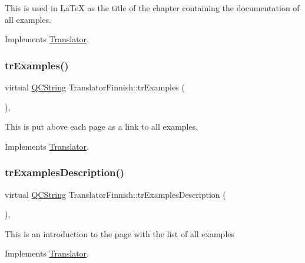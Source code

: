 This is used in La\+TeX as the title of the chapter containing the documentation of all examples. 

Implements \mbox{\hyperlink{class_translator}{Translator}}.

\mbox{\label{class_translator_finnish_a3e1175a17bd1dc864dfcbc5434eb0c8d}} 
\subsubsection{\texorpdfstring{trExamples()}{trExamples()}}
{\footnotesize\ttfamily virtual \mbox{\hyperlink{class_q_c_string}{Q\+C\+String}} Translator\+Finnish\+::tr\+Examples (\begin{DoxyParamCaption}{ }\end{DoxyParamCaption})\hspace{0.3cm}{\ttfamily [inline]}, {\ttfamily [virtual]}}

This is put above each page as a link to all examples. 

Implements \mbox{\hyperlink{class_translator}{Translator}}.

\mbox{\label{class_translator_finnish_a3374b8c8f1bc8eed4a680a4d179667dc}} 
\subsubsection{\texorpdfstring{trExamplesDescription()}{trExamplesDescription()}}
{\footnotesize\ttfamily virtual \mbox{\hyperlink{class_q_c_string}{Q\+C\+String}} Translator\+Finnish\+::tr\+Examples\+Description (\begin{DoxyParamCaption}{ }\end{DoxyParamCaption})\hspace{0.3cm}{\ttfamily [inline]}, {\ttfamily [virtual]}}

This is an introduction to the page with the list of all examples 

Implements \mbox{\hyperlink{class_translator}{Translator}}.

\mbox{\label{class_translator_finnish_a91cc50b9356cd63a2d2e30cf9e1367de}} 
